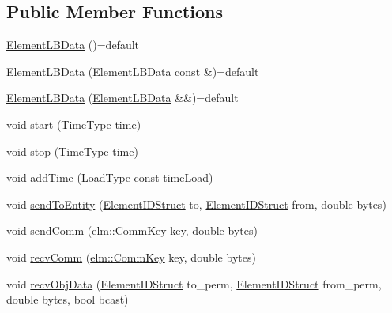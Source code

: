 \subsection*{Public Member Functions}
\begin{DoxyCompactItemize}
\item 
\hyperlink{structvt_1_1elm_1_1_element_l_b_data_aa7a5f68f276e0d3ae1279bb0f3050e4d}{Element\+L\+B\+Data} ()=default
\item 
\hyperlink{structvt_1_1elm_1_1_element_l_b_data_a2aa0d177c123d04ac24342b9558f3c46}{Element\+L\+B\+Data} (\hyperlink{structvt_1_1elm_1_1_element_l_b_data}{Element\+L\+B\+Data} const \&)=default
\item 
\hyperlink{structvt_1_1elm_1_1_element_l_b_data_a8ab77d61c0c9351e21329445e7a7b844}{Element\+L\+B\+Data} (\hyperlink{structvt_1_1elm_1_1_element_l_b_data}{Element\+L\+B\+Data} \&\&)=default
\item 
void \hyperlink{structvt_1_1elm_1_1_element_l_b_data_a19e990ccbc5b1090e8d8385e19af760a}{start} (\hyperlink{namespacevt_a2b9f28078dc309ad0706b69ded743e69}{Time\+Type} time)
\item 
void \hyperlink{structvt_1_1elm_1_1_element_l_b_data_a96ccd1c4f6ec13365ca9d483eab8944c}{stop} (\hyperlink{namespacevt_a2b9f28078dc309ad0706b69ded743e69}{Time\+Type} time)
\item 
void \hyperlink{structvt_1_1elm_1_1_element_l_b_data_ada678fdc6f4b80c29bbe0f1c973a13e3}{add\+Time} (\hyperlink{namespacevt_a8fb51741340b87d7aaee0bef60e9896b}{Load\+Type} const time\+Load)
\item 
void \hyperlink{structvt_1_1elm_1_1_element_l_b_data_aa4d5faecce53f1ad3d4565a4e7b1cd10}{send\+To\+Entity} (\hyperlink{structvt_1_1elm_1_1_element_i_d_struct}{Element\+I\+D\+Struct} to, \hyperlink{structvt_1_1elm_1_1_element_i_d_struct}{Element\+I\+D\+Struct} from, double bytes)
\item 
void \hyperlink{structvt_1_1elm_1_1_element_l_b_data_ab7360fde34acf4dafafc8335617d8b6b}{send\+Comm} (\hyperlink{structvt_1_1elm_1_1_comm_key}{elm\+::\+Comm\+Key} key, double bytes)
\item 
void \hyperlink{structvt_1_1elm_1_1_element_l_b_data_af19f7cc95b8139b7aeec788e6450f28f}{recv\+Comm} (\hyperlink{structvt_1_1elm_1_1_comm_key}{elm\+::\+Comm\+Key} key, double bytes)
\item 
void \hyperlink{structvt_1_1elm_1_1_element_l_b_data_abe5161d28be7bccf79081ee9e8408ead}{recv\+Obj\+Data} (\hyperlink{structvt_1_1elm_1_1_element_i_d_struct}{Element\+I\+D\+Struct} to\+\_\+perm, \hyperlink{structvt_1_1elm_1_1_element_i_d_struct}{Element\+I\+D\+Struct} from\+\_\+perm, double bytes, bool bcast)

\end{DoxyCompactItemize}
